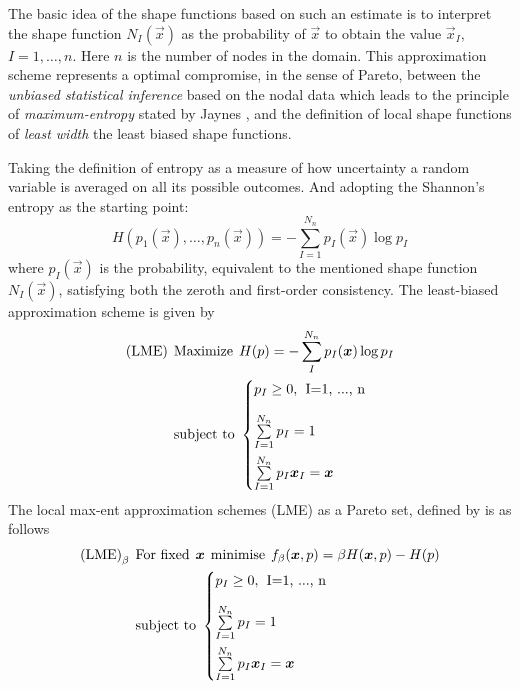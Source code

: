 The basic idea of the shape functions based on such
an estimate is to interpret the shape function $N_I(\vec{x})$ as the
probability of $\vec{x}$ to obtain the value $\vec{x}_I$,  $I=1,
\dots, n$. Here $n$ is the number of nodes in the domain.
This approximation scheme represents a optimal compromise, in the sense of
Pareto, between the \textit{unbiased statistical inference} based on
the nodal data which leads to the principle of \textit{maximum-entropy}
stated by Jaynes \cite{Jaynes1957}, and the definition of local shape
functions of \textit{least width} the least biased shape functions.

Taking the definition of entropy as a measure of how uncertainty a
random variable is averaged on all its possible outcomes. And adopting
the Shannon's entropy as the starting point:
\begin{equation}
  \label{eq:Shannon-entropy}
  H(p_1(\vec{x}),\ldots,p_n(\vec{x})) = -\sum^{N_n}_{I=1}{p_I(\vec{x})\log p_I }
\end{equation}
where $p_I(\vec{x})$ is the probability, equivalent to the mentioned
shape function $N_I(\vec{x})$,  satisfying both the zeroth and
first-order consistency. The least-biased approximation scheme is
given by
\begin{align*}
  \label{eq:least-biased-approximation-scheme}
  \text{(LME)} \hspace{0.15cm} &\text{Maximize} \hspace{0.15cm} H(p) =
  -\sum_{I}^{N_n}{p_I(\vec{x})\log p_I }\\
  &\text{subject to}\
  \begin{cases}
    p_I \ge 0, \hspace{0.15cm} \text{I=1, ..., n} \\[1em]   
    \sum\limits_{I=1}^{N_n}{p_I} = 1 \\[1em]   
    \sum\limits_{I=1}^{N_n}{p_I \vec{x}_I} = \vec{x} \\
  \end{cases}
\end{align*}
The local max-ent approximation schemes (LME) as a Pareto set,
defined by \cite{Arroyo2006} is as follows
\begin{align*}
  \label{eq:LME-scheme-pareto-set}
  \text{(LME)}_{\beta} \hspace{0.15cm} &\text{For fixed} \hspace{0.15cm}
  \vec{x} \hspace{0.15cm} \text{minimise} \hspace{0.15cm} f_{\beta}(\vec{x}, p) = \beta H(\vec{x},p) - H(p) \\
  &\text{subject to}\
  \begin{cases}
    p_I \ge 0, \hspace{0.15cm} \text{I=1, ..., n} \\[1em]   
    \sum\limits_{I=1}^{N_n}{p_I} = 1 \\[1em]   
    \sum\limits_{I=1}^{N_n}{p_I \vec{x}_I} = \vec{x} \\
  \end{cases}
\end{align*}
